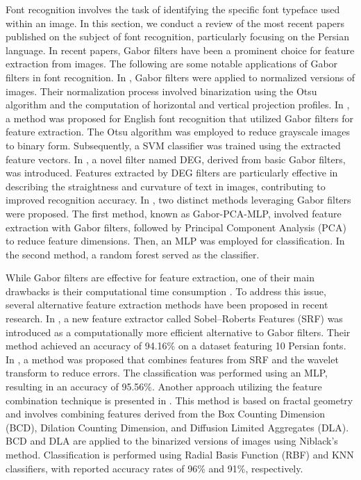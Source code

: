 \documentclass[conference]{IEEEtran}
\begin{document}
Font recognition involves the task of identifying the specific font typeface used within an image. In this section, we conduct a review of the most recent papers published on the subject of font recognition, particularly focusing on the Persian language.
In recent papers, Gabor filters have been a prominent choice for feature extraction from images. The following are some notable applications of Gabor filters in font recognition.
In \cite{1}, Gabor filters were applied to normalized versions of images. Their normalization process involved binarization using the Otsu algorithm and the computation of horizontal and vertical projection profiles.
In \cite{42}, a method was proposed for English font recognition that utilized Gabor filters for feature extraction. The Otsu algorithm was employed to reduce grayscale images to binary form. Subsequently, a SVM classifier was trained using the extracted feature vectors.
In \cite{10}, a novel filter named DEG, derived from basic Gabor filters, was introduced. Features extracted by DEG filters are particularly effective in describing the straightness and curvature of text in images, contributing to improved recognition accuracy.
In \cite{11}, two distinct methods leveraging Gabor filters were proposed. The first method, known as Gabor-PCA-MLP, involved feature extraction with Gabor filters, followed by Principal Component Analysis (PCA) to reduce feature dimensions. Then, an MLP was employed for classification. In the second method, a random forest served as the classifier.

While Gabor filters are effective for feature extraction, one of their main drawbacks is their computational time consumption \cite{2}. To address this issue, several alternative feature extraction methods have been proposed in recent research.
In \cite{2}, a new feature extractor called Sobel–Roberts Features (SRF) was introduced as a computationally more efficient alternative to Gabor filters. Their method achieved an accuracy of 94.16\% on a dataset featuring 10 Persian fonts.
In \cite{8}, a method was proposed that combines features from SRF and the wavelet transform to reduce errors. The classification was performed using an MLP, resulting in an accuracy of 95.56\%.
Another approach utilizing the feature combination technique is presented in \cite{3}. This method is based on fractal geometry and involves combining features derived from the Box Counting Dimension (BCD), Dilation Counting Dimension, and Diffusion Limited Aggregates (DLA). BCD and DLA are applied to the binarized versions of images using Niblack's method. Classification is performed using Radial Basis Function (RBF) and KNN classifiers, with reported accuracy rates of 96\% and 91\%, respectively.
\end{document}
